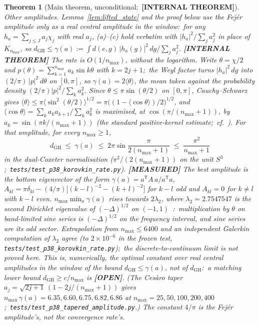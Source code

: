 \documentclass[11pt,a4paper]{article}
\theoremstyle{plain}
\newtheorem{theorem}{Theorem}[section]
\theoremstyle{definition}
\newcommand{\nmax}{n_{\max}}
\newcommand{\sthree}{S^{3}}
\newcommand{\KS}{K}
\begin{document}
\begin{theorem}[Main theorem, unconditional;\ \textbf{[INTERNAL THEOREM]}]
\emph{Other amplitudes.}  Lemma~\ref{lem:lifted_state} and the proof
below use the Fej\'er amplitude only as a real central amplitude in the
window:\ for any $h_a = \sum_{j \le J} a_j \chi_j$ with real $a_j$,
(a)--(c) hold verbatim with $|h_a|^2/\sum_j a_j^2$ in place of
$\KS_{\nmax}$, so $d_{\mathrm{GH}} \le \gamma(a) := \int d(e, g)\,
|h_a(g)|^2\, dg / \sum_j a_j^2$.  \textbf{[INTERNAL THEOREM]} The rate
is $O(1/\nmax)$, without the logarithm.  Write $\theta = \chi/2$ and
$p(\theta) = \sum_{k=1}^{\nmax} a_k \sin k\theta$ with $k = 2j+1$;\ the
Weyl factor turns $|h_a|^2\, dg$ into $(2/\pi)\,|p|^2\, d\theta$ on
$[0,\pi]$, so $\gamma(a) = 2\langle\theta\rangle$, the mean taken
against the probability density $(2/\pi)|p|^2/\sum_k a_k^2$.  Since
$\theta \le \pi \sin(\theta/2)$ on $[0,\pi]$, Cauchy--Schwarz gives
$\langle\theta\rangle \le \pi \langle \sin^2(\theta/2)\rangle^{1/2}
= \pi \bigl((1 - \langle\cos\theta\rangle)/2\bigr)^{1/2}$, and
$\langle\cos\theta\rangle = \sum_k a_k a_{k+1} / \sum_k a_k^2$ is
maximised, at $\cos(\pi/(\nmax+1))$, by $a_k = \sin(\pi k/(\nmax+1))$
(the standard positive-kernel estimate;\ cf.~\cite{korovkin1960}).  For
that amplitude, for every $\nmax \ge 1$,
\begin{equation}\label{eq:korovkin_rate}
d_{\mathrm{GH}} \;\le\; \gamma(a) \;\le\; 2\pi \sin\frac{\pi}{2(\nmax+1)}
\;\le\; \frac{\pi^2}{\nmax+1}
\end{equation}
in the dual-Coxeter normalisation ($\pi^2/(2(\nmax+1))$ on the unit
$\sthree$;\ \texttt{tests/test\_p38\_korovkin\_rate.py}).
\textbf{[MEASURED]} The best amplitude is the bottom
eigenvector of the form $\gamma(a) = a^{\mathsf T} A\, a / a^{\mathsf T}
a$, $A_{kl} = \pi\delta_{kl} - (4/\pi)\bigl[(k-l)^{-2} -
(k+l)^{-2}\bigr]$ for $k - l$ odd and $A_{kl} = 0$ for $k \ne l$ with
$k - l$ even.  $\nmax \min_a \gamma(a)$ rises towards $2\lambda_2$, where
$\lambda_2 = 2.7547547$ is the second Dirichlet eigenvalue of
$(-\Delta)^{1/2}$ on $(-1,1)$~\cite{kwasnicki2012}:\ multiplication by
$\theta$ on band-limited sine series is $(-\Delta)^{1/2}$ on the
frequency interval, and sine series are its odd sector.  Extrapolation
from $\nmax \le 6400$ and an independent Galerkin computation of
$\lambda_2$ agree (to $2 \times 10^{-6}$ in the frozen test,
\texttt{tests/test\_p38\_korovkin\_rate.py});\ the discrete-to-continuum
limit is not proved here.  This is, numerically, the optimal constant over
real central amplitudes in the window of the bound $d_{\mathrm{GH}} \le
\gamma(a)$, not of $d_{\mathrm{GH}}$:\ a matching lower bound
$d_{\mathrm{GH}} \ge c/\nmax$ is \textbf{[OPEN]}.  (The Ces\`aro taper
$a_j = \sqrt{2j+1}\,(1 - 2j/(\nmax+1))$ gives $\nmax\,\gamma(a) = 6.35,
6.60, 6.75, 6.82, 6.86$ at $\nmax = 25, 50, 100, 200, 400$;\
\texttt{tests/test\_p38\_tapered\_amplitude.py}.)  The constant $4/\pi$
is the Fej\'er amplitude's, not the convergence rate's.
\end{theorem}
\end{document}
